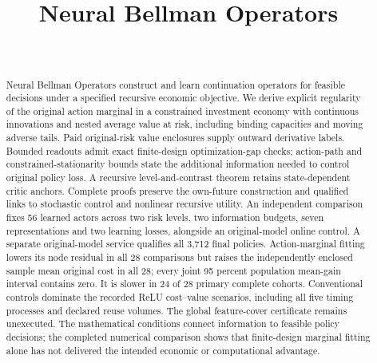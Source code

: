 \documentclass[ecta,nameyear,draft]{econsocart}
\begin{document}
\begin{frontmatter}
\title{Neural Bellman Operators}
\begin{aug}
\author[id=au1,addressref={add1}]{~}
\address[id=add1]{Peking University}
\end{aug}
\begin{abstract}
Neural Bellman Operators construct and learn continuation operators for feasible
decisions under a specified recursive economic objective. We derive explicit
regularity of the original action marginal in a constrained investment economy
with continuous innovations and nested average value at risk, including binding
capacities and moving adverse tails. Paid original-risk value enclosures supply
outward derivative labels. Bounded readouts admit exact finite-design
optimization-gap checks; action-path and constrained-stationarity bounds
state the additional information needed to control original policy loss.
A recursive level-and-contrast theorem retains state-dependent critic anchors.
Complete proofs preserve the own-future construction and qualified links to
stochastic control and nonlinear recursive utility. An independent comparison
fixes 56 learned actors across two risk levels, two information budgets,
seven representations and two learning losses, alongside an original-model
online control. A separate
original-model service qualifies all 3,712 final policies. Action-marginal
fitting lowers its node residual in all 28 comparisons but raises the
independently enclosed sample mean original cost in all 28; every joint
95 percent population mean-gain interval contains zero. It is slower in
24 of 28 primary complete cohorts. Conventional controls dominate the recorded
ReLU cost--value scenarios, including all five timing processes and declared
reuse volumes. The global feature-cover certificate remains unexecuted.
The mathematical conditions connect information to feasible policy decisions;
the completed numerical comparison shows that finite-design marginal fitting
alone has not delivered the intended economic or computational advantage.
\end{abstract}
\begin{keyword}
\end{keyword}
\end{frontmatter}









\begingroup
\let\NBOBibliographyStart\thebibliography
\renewcommand{\thebibliography}[1]{\NBOBibliographyStart{#1}\raggedright}

\endgroup
\end{document}
